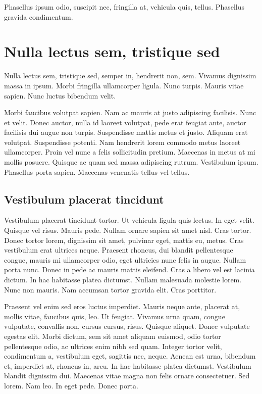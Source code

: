 \documentclass[../hdr.tex]{subfiles}
\begin{document}
Phasellus ipsum odio, suscipit nec, fringilla at, vehicula quis, tellus.
Phasellus gravida condimentum.

\section{Nulla lectus sem, tristique sed}

Nulla lectus sem, tristique sed, semper in, hendrerit non, sem. Vivamus
dignissim massa in ipsum. Morbi fringilla ullamcorper ligula. Nunc turpis.
Mauris vitae sapien. Nunc luctus bibendum velit.

Morbi faucibus volutpat sapien. Nam ac mauris at justo adipiscing facilisis.
Nunc et velit. Donec auctor, nulla id laoreet volutpat, pede erat feugiat ante,
auctor facilisis dui augue non turpis. Suspendisse mattis metus et justo.
Aliquam erat volutpat. Suspendisse potenti. Nam hendrerit lorem commodo metus
laoreet ullamcorper. Proin vel nunc a felis sollicitudin pretium. Maecenas in
metus at mi mollis posuere. Quisque ac quam sed massa adipiscing rutrum.
Vestibulum ipsum. Phasellus porta sapien. Maecenas venenatis tellus vel tellus.

\subsection{Vestibulum placerat tincidunt}

Vestibulum placerat tincidunt tortor. Ut vehicula ligula quis lectus. In eget
velit. Quisque vel risus. Mauris pede. Nullam ornare sapien sit amet nisl. Cras
tortor. Donec tortor lorem, dignissim sit amet, pulvinar eget, mattis eu, metus.
Cras vestibulum erat ultrices neque. Praesent rhoncus, dui blandit pellentesque
congue, mauris mi ullamcorper odio, eget ultricies nunc felis in augue. Nullam
porta nunc. Donec in pede ac mauris mattis eleifend. Cras a libero vel est
lacinia dictum. In hac habitasse platea dictumst. Nullam malesuada molestie
lorem. Nunc non mauris. Nam accumsan tortor gravida elit. Cras porttitor.

Praesent vel enim sed eros luctus imperdiet. Mauris neque ante, placerat at,
mollis vitae, faucibus quis, leo. Ut feugiat. Vivamus urna quam, congue
vulputate, convallis non, cursus cursus, risus. Quisque aliquet. Donec vulputate
egestas elit. Morbi dictum, sem sit amet aliquam euismod, odio tortor
pellentesque odio, ac ultrices enim nibh sed quam. Integer tortor velit,
condimentum a, vestibulum eget, sagittis nec, neque. Aenean est urna, bibendum
et, imperdiet at, rhoncus in, arcu. In hac habitasse platea dictumst. Vestibulum
blandit dignissim dui. Maecenas vitae magna non felis ornare consectetuer. Sed
lorem. Nam leo. In eget pede. Donec porta.
\end{document}
